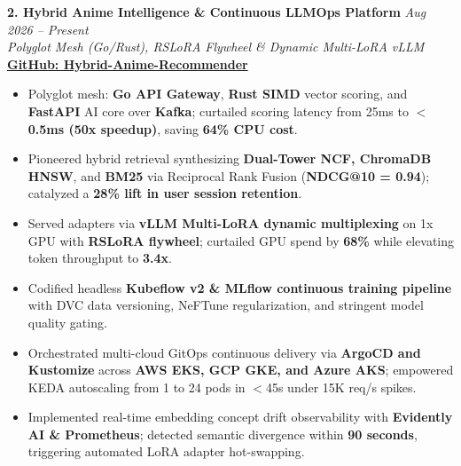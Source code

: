 \documentclass[9.5pt,a4paper]{article}
\begin{document}
\vspace{2.0pt}
\noindent\textbf{2. Hybrid Anime Intelligence \& Continuous LLMOps Platform} \hfill {\small\textit{Aug 2026 -- Present}}\\
\textit{Polyglot Mesh (Go/Rust), RSLoRA Flywheel \& Dynamic Multi-LoRA vLLM} \hfill {\footnotesize\href{https://github.com/KishorKumarParoi/Hybrid-Anime-Recommender}{\textbf{GitHub: Hybrid-Anime-Recommender}}}
\begin{itemize}
    \item Polyglot mesh: \textbf{Go API Gateway}, \textbf{Rust SIMD} vector scoring, and \textbf{FastAPI} AI core over \textbf{Kafka}; curtailed scoring latency from 25ms to \textbf{$<$0.5ms (50x speedup)}, saving \textbf{64\% CPU cost}.
    \item Pioneered hybrid retrieval synthesizing \textbf{Dual-Tower NCF, ChromaDB HNSW}, and \textbf{BM25} via Reciprocal Rank Fusion (\textbf{NDCG@10 = 0.94}); catalyzed a \textbf{28\% lift in user session retention}.
    \item Served adapters via \textbf{vLLM Multi-LoRA dynamic multiplexing} on 1x GPU with \textbf{RSLoRA flywheel}; curtailed GPU spend by \textbf{68\%} while elevating token throughput to \textbf{3.4x}.
    \item Codified headless \textbf{Kubeflow v2 \& MLflow continuous training pipeline} with DVC data versioning, NeFTune regularization, and stringent model quality gating.
    \item Orchestrated multi-cloud GitOps continuous delivery via \textbf{ArgoCD and Kustomize} across \textbf{AWS EKS, GCP GKE, and Azure AKS}; empowered KEDA autoscaling from 1 to 24 pods in $<$45s under 15K req/s spikes.
    \item Implemented real-time embedding concept drift observability with \textbf{Evidently AI \& Prometheus}; detected semantic divergence within \textbf{90 seconds}, triggering automated LoRA adapter hot-swapping.
\end{itemize}
\end{document}

